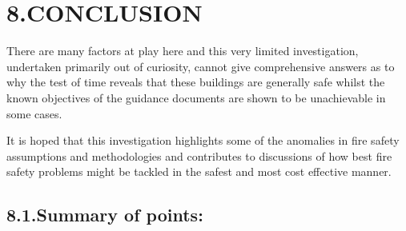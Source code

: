 \documentclass{style/llncs}
\begin{document}
\section{8.\hspace*{0.5em}CONCLUSION}\label{sec-conclusion}%

\noindent{}There are many factors at play here and this very limited investigation, undertaken primarily out of curiosity, cannot give comprehensive answers as to why the test of time reveals that these buildings are generally safe whilst the known objectives of the guidance documents are shown to be unachievable in some cases. %

It is hoped that this investigation highlights some of the anomalies in fire safety assumptions and methodologies and contributes to discussions of how best fire safety problems might be tackled in the safest and most cost effective manner.%

\subsection{8.1.\hspace*{0.5em}Summary of points:}\label{sec-summary-of-points-}%
\end{document}
